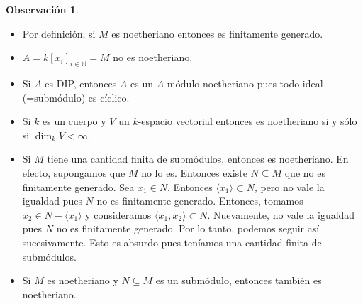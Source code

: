 \documentclass[12pt]{book}
\theoremstyle{definition}
\newtheorem{obs}[teo]{Observación}
\newcommand{\NN}{\mathbb{N}}
\begin{document}
\begin{obs}
\begin{itemize}
\item Por definición, si $M$ es noetheriano entonces es finitamente generado.
\item $A=k[x_i]_{i\in \NN}=M$ no es noetheriano.
\item Si $A$ es DIP, entonces $A$ es un $A$-módulo noetheriano pues todo ideal (=submódulo) es cíclico.
\item Si $k$ es un cuerpo y $V$ un $k$-espacio vectorial entonces es noetheriano si y sólo si $\dim_k V < \infty$.
\item Si $M$ tiene una cantidad finita de submódulos, entonces es noetheriano. En efecto, supongamos que $M$ no lo es. Entonces existe $N\subseteq M$ que no es finitamente generado. Sea $x_1\in N$. Entonces $\langle x_1\rangle \subset N$, pero no vale la igualdad pues $N$ no es finitamente generado. Entonces, tomamos $x_2\in N-\langle x_1\rangle$ y consideramos $\langle x_1,x_2\rangle\subset N$. Nuevamente, no vale la igualdad pues $N$ no es finitamente generado. Por lo tanto, podemos seguir así sucesivamente. Esto es absurdo pues teníamos una cantidad finita de submódulos.
\item Si $M$ es noetheriano y $N\subseteq M$ es un submódulo, entonces también es noetheriano.
\end{itemize}
\end{obs}
\end{document}
